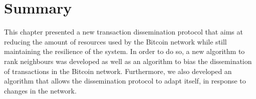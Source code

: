\section{Summary}
\label{sec:wsum}
This chapter presented a new transaction dissemination protocol that aims at reducing the amount of resources used by the Bitcoin network while still maintaining the resilience of the system. In order to do so, a new algorithm to rank neighbours was developed as well as an algorithm to bias the dissemination of transactions in the Bitcoin network. Furthermore, we also developed an algorithm that allows the dissemination protocol to adapt itself, in response  to changes in the network. 
